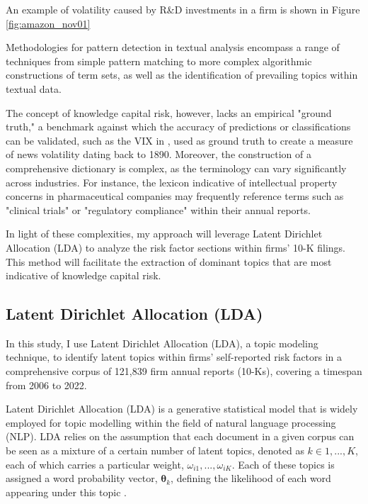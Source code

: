 \documentclass[12pt, letterpaper]{article}
\begin{document}
An example of volatility caused by R\&D investments in a firm is shown in Figure \ref{fig:amazon_nov01} 


Methodologies for pattern detection in textual analysis encompass a range of techniques from simple pattern matching to more complex algorithmic constructions of term sets, as well as the identification of prevailing topics within textual data.

The concept of knowledge capital risk, however, lacks an empirical "ground truth," a benchmark against which the accuracy of predictions or classifications can be validated, such as the VIX in \cite{Manela2017-lj}, used as ground truth to create a measure of news volatility dating back to 1890. Moreover, the construction of a comprehensive dictionary is complex, as the terminology can vary significantly across industries. For instance, the lexicon indicative of intellectual property concerns in pharmaceutical companies may frequently reference terms such as "clinical trials" or "regulatory compliance" within their annual reports.

In light of these complexities, my approach will leverage Latent Dirichlet Allocation (LDA) to analyze the risk factor sections within firms' 10-K filings. This method will facilitate the extraction of dominant topics that are most indicative of knowledge capital risk. 

\subsection{Latent Dirichlet Allocation (LDA)}

In this study, I use Latent Dirichlet Allocation (LDA), a topic modeling technique, to identify latent topics within firms' self-reported risk factors in a comprehensive corpus of 121,839 firm annual reports (10-Ks), covering a timespan from 2006 to 2022.


Latent Dirichlet Allocation (LDA) is a generative statistical model that is widely employed for topic modelling within the field of natural language processing (NLP). LDA relies on the assumption that each document in a given corpus can be seen as a mixture of a certain number of latent topics, denoted as $k \in {1, ..., K}$, each of which carries a particular weight, $\omega_{i1}, ..., \omega_{iK}$. Each of these topics is assigned a word probability vector, $\mathbf{\theta}_k$, defining the likelihood of each word appearing under this topic \citep{Blei2003-ay}.
\end{document}
